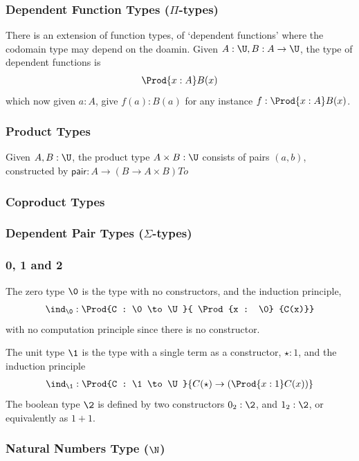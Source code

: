 \subsubsection{Dependent Function Types ($\Pi$-types)}
There is an extension of function types, of `dependent functions' where the codomain type may depend
on the doamin. Given $A : \U, B : A \to \U$, the type of dependent functions is
\begin{align*}
  \Prod{x:A} B(x)
\end{align*}
which now given $a : A$, give $f(a) : B(a)$ for any instance $f : \Prod{x:A} B(x)$.

\subsubsection{Product Types}
Given $A, B : \U$, the product type $A \times B : \U$ consists of pairs $(a, b)$, constructed by $\mathsf{pair} : A \to (B \to A \times B)
To$ 

\subsubsection{Coproduct Types}

\subsubsection{Dependent Pair Types ($\Sigma$-types)}

\subsubsection{0, 1 and 2}
The zero type $\0$ is the type with no constructors, and the induction principle, 
\begin{align*}
  \ind_\0 : \Prod{C : \0 \to \U}{ \Prod{x : \0} {C(x)}}
\end{align*}
with no computation principle since there is no constructor.

The unit type $\1$ is the type with a single term as a constructor, $\star : 1$, and the induction principle
\begin{align*}
  \ind_{\1} : \Prod{C : \1 \to \U}{C(\star) \to \left(\Prod{x : 1} C(x)\right)}
\end{align*}
The boolean type $\2$ is defined by two constructors $0_2 : \2$, and $1_2 : \2$, or equivalently as $1 + 1$.

\subsubsection{Natural Numbers Type ($\N$)}

